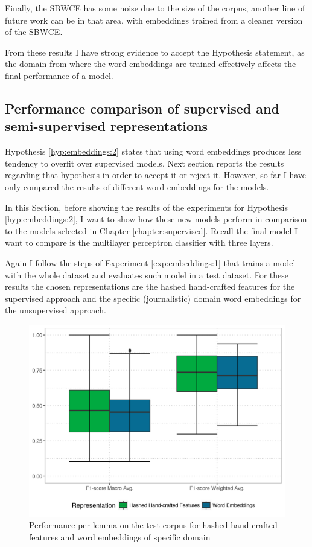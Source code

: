 Finally, the SBWCE has some noise due to the size of the corpus, another line
of future work can be in that area, with embeddings trained from a cleaner
version of the SBWCE.

From these results I have strong evidence to accept the Hypothesis statement,
as the domain from where the word embeddings are trained effectively affects
the final performance of a model.

\subsection{Performance comparison of supervised and semi-supervised
representations}\label{sec:embeddings:results:supvsem}

Hypothesis \ref{hyp:embeddings:2} states that using word embeddings
produces less tendency to overfit over supervised models. Next section reports
the results regarding that hypothesis in order to accept it or reject it.
However, so far I have only compared the results of different word embeddings
for the models.

In this Section, before showing the results of the experiments for Hypothesis
\ref{hyp:embeddings:2}, I want to show how these new models perform in
comparison to the models selected in Chapter \ref{chapter:supervised}. Recall
the final model I want to compare is the multilayer perceptron classifier with
three layers.

Again I follow the steps of Experiment \ref{exp:embeddings:1} that trains a
model with the whole dataset and evaluates such model in a test dataset. For
these results the chosen representations are the hashed hand-crafted features
for the supervised approach and the specific (journalistic) domain word
embeddings for the unsupervised approach.

\begin{figure}[ht]
	\includegraphics[width=\textwidth]{plots/embeddings/supervised_embeddings}
  \caption{Performance per lemma on the test corpus for hashed hand-crafted
  features and word embeddings of specific domain}
  \label{fig:embeddings:performance_supervised_embeddings}
\end{figure}

